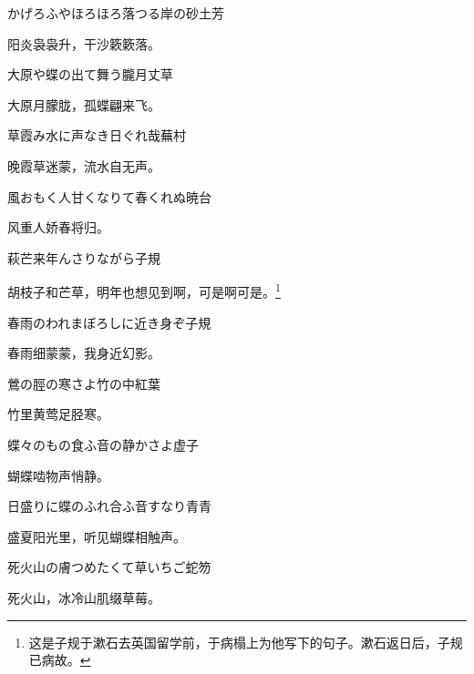 \begin{haiku}
    {\FH かげろふやほろほろ落つる岸の砂}\hfill{\FH 土芳}

    {\FK 阳炎袅袅升，干沙簌簌落。}
\end{haiku}

\begin{haiku}
    {\FH 大原や蝶の出て舞う朧月}\hfill{\FH 丈草}

    {\FK 大原月朦胧，孤蝶翩来飞。}
\end{haiku}

\begin{haiku}
    {\FH 草霞み水に声なき日ぐれ哉}\hfill{\FH 蕪村}

    {\FK 晚霞草迷蒙，流水自无声。}
\end{haiku}

\begin{haiku}
    {\FH 風おもく人甘くなりて春くれぬ}\hfill{\FH 暁台}

    {\FK 风重人娇春将归。}
\end{haiku}

\begin{haiku}
    {\FH 萩芒来年んさりながら}\hfill{\FH 子規}

    {\FK 胡枝子和芒草，明年也想见到啊，可是啊可是。\footnote{\FT 这是子规于漱石去英国留学前，于病榻上为他写下的句子。漱石返日后，子规已病故。​​​}}
\end{haiku}

\begin{haiku}
    {\FH 春雨のわれまぼろしに近き身ぞ}\hfill{\FH 子規}

    {\FK 春雨细蒙蒙，我身近幻影。}
\end{haiku}

\begin{haiku}
    {\FH 鶯の脛の寒さよ竹の中}\hfill{\FH 紅葉}

    {\FK 竹里黄莺足胫寒。}
\end{haiku}

\begin{haiku}
    {\FH 蝶々のもの食ふ音の静かさよ}\hfill{\FH 虚子}

    {\FK 蝴蝶啮物声悄静。}
\end{haiku}

\begin{haiku}
    {\FH 日盛りに蝶のふれ合ふ音すなり}\hfill{\FH 青青}

    {\FK 盛夏阳光里，听见蝴蝶相触声。}
\end{haiku}

\begin{haiku}
    {\FH 死火山の膚つめたくて草いちご}\hfill{\FH 蛇笏}

    {\FK 死火山，冰冷山肌缀草莓。}
\end{haiku}

